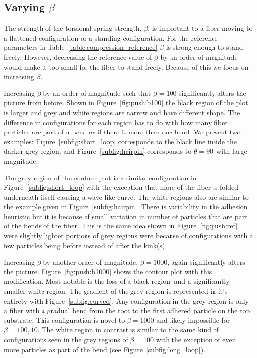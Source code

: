 {\subsection{Varying $\beta$}

The strength of the torsional spring strength, $\beta$, is important to a fiber moving to a flattened configuration or a standing configuration. For the reference parameters in Table~\ref{table:compression_reference} $\beta$ is strong enough to stand freely. However, decreasing the reference value of $\beta$ by an order of magnitude would make it too small for the fiber to stand freely. Because of this we focus on increasing $\beta$.

Increasing $\beta$ by an order of magnitude such that $\beta=100$ significantly alters the picture from before. Shown in Figure~\ref{fig:push:b100} the black region of the plot is larger and grey and white regions are narrow and have different shape. The difference in configurations for each region has to do with how many fiber particles are part of a bend or if there is more than one bend. We present two examples: Figure~\ref{subfig:short_loop} corresponds to the black line inside the darker grey region, and Figure~\ref{subfig:hairpin} corresponds to $\theta=90$\textdegree\ with large magnitude.

The grey region of the contour plot is a similar configuration in Figure~\ref{subfig:short_loop} with the exception that more of the fiber is folded underneath itself causing a wave-like curve. The white regions also are similar to the example given in Figure~\ref{subfig:hairpin}. There is variability in the adhesion heuristic but it is because of small variation in number of particles that are part of the bends of the fiber. This is the same idea shown in Figure~\ref{fig:push:ref} were slightly lighter portions of grey regions were because of configurations with a few particles being before instead of after the kink(s).

Increasing $\beta$ by another order of magnitude, $\beta=1000$, again significantly alters the picture. Figure~\ref{fig:push:b1000} shows the contour plot with this modification. Most notable is the loss of a black region, and a significantly smaller white region. The gradient of the grey region is represented in it's entirety with Figure~\ref{subfig:curved}. Any configuration in the grey region is only a fiber with a gradual bend from the root to the first adhered particle on the top substrate. This configuration is novel to $\beta=1000$ and likely impossible for $\beta=100,10$. The white region in contrast is similar to the same kind of configurations seen in the grey regions of $\beta=100$ with the exception of even more particles as part of the bend (see Figure~\ref{subfig:long_loop}).

}
